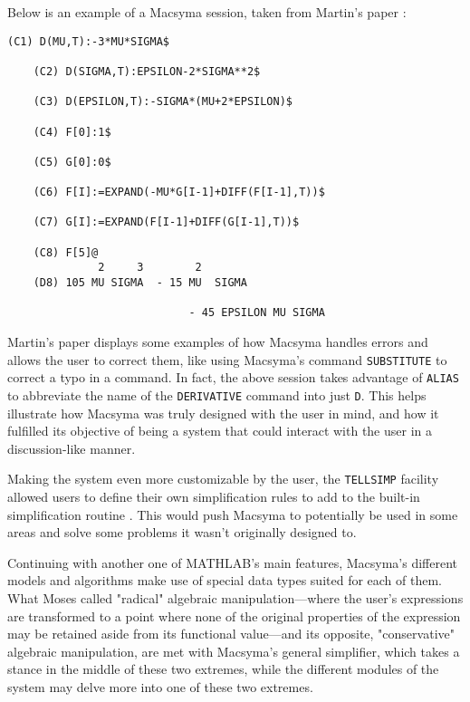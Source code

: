 Below is an example of a Macsyma session, taken from Martin's paper \parencite{martin1971macsyma}:

\begin{lstlisting}[caption={Example of a Macsyma session.},label={lst:example-macsyma-session},numbers=none]
    (C1) D(MU,T):-3*MU*SIGMA$
    
    (C2) D(SIGMA,T):EPSILON-2*SIGMA**2$

    (C3) D(EPSILON,T):-SIGMA*(MU+2*EPSILON)$

    (C4) F[0]:1$

    (C5) G[0]:0$

    (C6) F[I]:=EXPAND(-MU*G[I-1]+DIFF(F[I-1],T))$

    (C7) G[I]:=EXPAND(F[I-1]+DIFF(G[I-1],T))$

    (C8) F[5]@
              2     3        2
    (D8) 105 MU SIGMA  - 15 MU  SIGMA

                            - 45 EPSILON MU SIGMA
\end{lstlisting}

Martin's paper displays some examples of how Macsyma handles errors and allows the user to correct them, like using Macsyma's command \verb|SUBSTITUTE| to correct a typo in a command. In fact, the above session takes advantage of \verb|ALIAS| to abbreviate the name of the \verb|DERIVATIVE| command into just \verb|D|. This helps illustrate how Macsyma was truly designed with the user in mind, and how it fulfilled its objective of being a system that could interact with the user in a discussion-like manner.

Making the system even more customizable by the user, the \verb|TELLSIMP| facility allowed users to define their own simplification rules to add to the built-in simplification routine \parencite{martin1971macsyma}. This would push Macsyma to potentially be used in some areas and solve some problems it wasn't originally designed to.

Continuing with another one of MATHLAB's main features, Macsyma's different models and algorithms make use of special data types suited for each of them. What Moses \parencite{moses1971algebraic} called "radical" algebraic manipulation---where the user's expressions are transformed to a point where none of the original properties of the expression may be retained aside from its functional value---and its opposite, "conservative" algebraic manipulation, are met with Macsyma's general simplifier, which takes a stance in the middle of these two extremes, while the different modules of the system may delve more into one of these two extremes.

